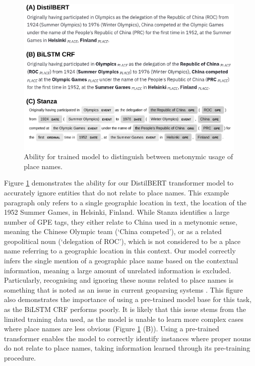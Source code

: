 \documentclass[]{interact}
\theoremstyle{plain}%
\theoremstyle{definition}
\theoremstyle{remark}
\begin{document}
\begin{figure}[tb]

{\centering \includegraphics[width=.9\linewidth]{main_files/figure-latex/qual_china-1} 

}

\caption{Ability for trained model to distinguish between metonymic usage of place names.}\label{fig:qual_china}
\end{figure}

Figure \ref{fig:qual_china} demonstrates the ability for our DistilBERT
transformer model to accurately ignore entities that do not relate to
place names. This example paragraph only refers to a single geographic
location in text, the location of the 1952 Summer Games, in Helsinki,
Finland. While Stanza identifies a large number of GPE tags, they either
relate to China used in a metynomic sense, meaning the Chinese Olympic
team (`China competed'), or as a related geopolitical noun (`delegation
of ROC'), which is not considered to be a place name referring to a
geographic location in this context. Our model correctly infers the
single mention of a geographic place name based on the contextual
information, meaning a large amount of unrelated information is
excluded. Particularly, recognising and ignoring these nouns related to
place names is something that is noted as an issue in current geoparsing
systems \citep{gritta2020}. This figure also demonstrates the importance
of using a pre-trained model base for this task, as the BiLSTM CRF
performs poorly. It is likely that this issue stems from the limited
training data used, as the model is unable to learn more complex cases
where place names are less obvious (Figure \ref{fig:qual_china} (B)).
Using a pre-trained transformer enables the model to correctly identify
instances where proper nouns do not relate to place names, taking
information learned through its pre-training procedure.
\end{document}

